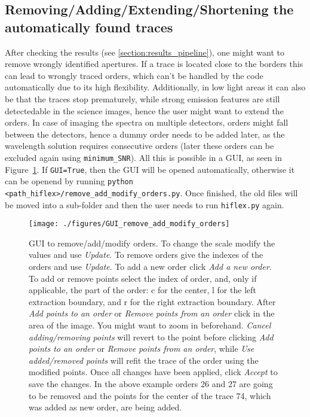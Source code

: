 \documentclass[10pt,a4paper]{article}
\begin{document}
\subsection{Removing/Adding/Extending/Shortening the automatically found traces}

After checking the results (see \ref{section:results_pipeline}), one might want to remove wrongly identified apertures. If a trace is located close to the borders this can lead to wrongly traced orders, which can't be handled by the code automatically due to its high flexibility. Additionally, in low light areas it can also be that the traces stop prematurely, while strong emission features are still detectedable in the science images, hence the user might want to extend the orders. In case of imaging the spectra on multiple detectors, orders might fall between the detectors, hence a dummy order needs to be added later, as the wavelength solution requires consecutive orders (later these orders can be excluded again using \verb|minimum_SNR|). All this is possible in a GUI, as seen in Figure~\ref{Fig:GUI_remove_add_modify_orders}. If \verb|GUI=True|, then the GUI will be opened automatically, otherwise it can be openend by running \verb|python <path_hiflex>/remove_add_modify_orders.py|. Once finished, the old files will be moved into a sub-folder and then the user needs to run \verb|hiflex.py| again.

\begin{figure} 
  \begin{center}
    \texttt{[image: ./figures/GUI\_remove\_add\_modify\_orders]}
  \end{center} 
  \caption{GUI to remove/add/modify orders. To change the scale modify the values and use \textit{Update}. To remove orders give the indexes of the orders and use \textit{Update}. To add a new order click \textit{Add a new order}. To add or remove points select the index of order, and, only if applicable, the part of the order: c for the center, l for the left extraction boundary, and r for the right extraction boundary. After \textit{Add points to an order} or \textit{Remove points from an order} click in the area of the image. You might want to zoom in beforehand. \textit{Cancel adding/removing points} will revert to the point before clicking \textit{Add points to an order} or \textit{Remove points from an order}, while \textit{Use added/removed points} will refit the trace of the order using the modified points. Once all changes have been applied, click \textit{Accept} to save the changes.
    \newline
    In the above example orders 26 and 27 are going to be removed and the points for the center of the trace 74, which was added as new order, are being added.
    \label{Fig:GUI_remove_add_modify_orders}}
\end{figure}
\end{document}
